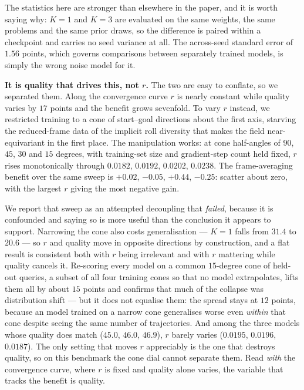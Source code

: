\documentclass[10pt,twocolumn,letterpaper]{article}
\theoremstyle{plain}
\begin{document}
The statistics here are stronger than elsewhere in the paper, and it is worth
saying why: $K{=}1$ and $K{=}3$ are evaluated on the same weights, the same
problems and the same prior draws, so the difference is paired within a
checkpoint and carries no seed variance at all. The across-seed standard error of
$1.56$ points, which governs comparisons between separately trained models, is
simply the wrong noise model for it.

\textbf{It is quality that drives this, not $r$.} The two are easy to conflate,
so we separated them. Along the convergence curve $r$ is nearly constant while
quality varies by $17$ points and the benefit grows sevenfold. To vary $r$
instead, we restricted training to a cone of start--goal directions about the
first axis, starving the reduced-frame data of the implicit roll diversity that
makes the field near-equivariant in the first place. The manipulation works: at
cone half-angles of $90$, $45$, $30$ and $15$ degrees, with training-set size and
gradient-step count held fixed, $r$ rises monotonically through $0.0182$,
$0.0192$, $0.0202$, $0.0238$. The frame-averaging benefit over the same sweep is
$+0.02$, $-0.05$, $+0.44$, $-0.25$: scatter about zero, with the largest $r$
giving the most negative gain.

We report that sweep as an attempted decoupling that \emph{failed}, because it
is confounded and saying so is more useful than the conclusion it appears to
support. Narrowing the cone also costs generalisation --- $K{=}1$ falls from
$31.4$ to $20.6$ --- so $r$ and quality move in opposite directions by
construction, and a flat result is consistent both with $r$ being irrelevant and
with $r$ mattering while quality cancels it. Re-scoring every model on a common
$15$-degree cone of held-out queries, a subset of all four training cones so that
no model extrapolates, lifts them all by about $15$ points and confirms that much
of the collapse was distribution shift --- but it does not equalise them: the
spread stays at $12$ points, because an model trained on a narrow cone generalises
worse even \emph{within} that cone despite seeing the same number of
trajectories. And among the three models whose quality does match ($45.0$, $46.0$,
$46.9$), $r$ barely varies ($0.0195$, $0.0196$, $0.0187$). The only setting that
moves $r$ appreciably is the one that destroys quality, so on this benchmark the
cone dial cannot separate them. Read \emph{with} the convergence curve, where $r$
is fixed and quality alone varies, the variable that tracks the benefit is
quality.
\end{document}
